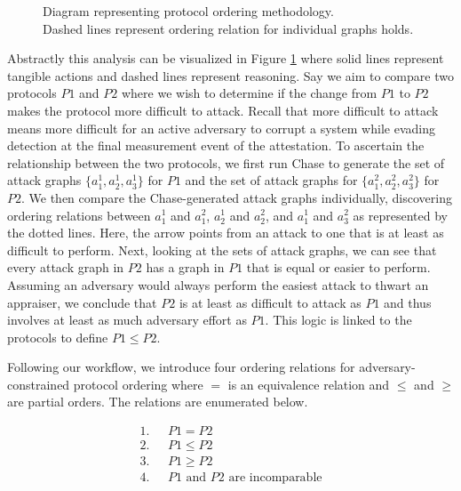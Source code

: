 \documentclass[runningheads]{llncs}
\theoremstyle{definition}
\begin{document}
\begin{figure}[hbtp]
    \centering
    \captionsetup{justification=centering,margin=1cm}
    
    \caption[Protocol ordering abstraction]{Diagram representing protocol ordering methodology. \\ Dashed lines represent ordering relation for individual graphs holds. }
    \label{fig:protocol-org-fig}
\end{figure}

Abstractly this analysis can be visualized in Figure \ref{fig:protocol-org-fig} where solid lines represent tangible actions and dashed lines represent reasoning. Say we aim to compare two protocols $P1$ and $P2$ where we wish to determine if the change from $P1$ to $P2$ makes the protocol more difficult to attack. Recall that more difficult to attack means more difficult for an active adversary to corrupt a system while evading detection at the final measurement event of the attestation. To ascertain the relationship between the two protocols, we first run Chase to generate the set of attack graphs $\{ a^1_1, a^1_2, a^1_3\}$ for $P1$ and the set of attack graphs for $\{a^2_1, a^2_2, a^2_3\}$ for $P2$. We then compare the Chase-generated attack graphs individually, discovering ordering relations between $a^1_1$ and $a^2_1$, $a^1_2$ and $a^2_2$, and $a^1_1$ and $a^2_3$ as represented by the dotted lines. Here, the arrow points from an attack to one that is at least as difficult to perform. Next, looking at the sets of attack graphs, we can see that every attack graph in $P2$ has a graph in $P1$ that is equal or easier to perform. Assuming an adversary would always perform the easiest attack to thwart an appraiser, we conclude that $P2$ is at least as difficult to attack as $P1$ and thus involves at least as much adversary effort as $P1$. This logic is linked to the protocols to define $ P1 \leq P2$.  

Following our workflow, we introduce four ordering relations for adversary-constrained protocol ordering where $=$ is an equivalence relation and $\le$ and $\ge$ are partial orders. The relations are enumerated below.

\vspace*{-5mm}

\begin{align*}
1. & \text{ } P1 = P2 \\
2. & \text{ } P1 \le P2 \\
3. & \text{ } P1 \ge P2 \\
4. & \text{ } P1 \text{ and } P2 \text{ are incomparable}
\end{align*}
\end{document}
